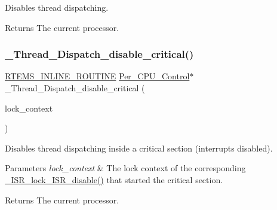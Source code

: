 Disables thread dispatching. 

\begin{DoxyReturn}{Returns}
The current processor. 
\end{DoxyReturn}
\mbox{\label{group__RTEMSScoreThread_ga5ffeb81480c63293a317f69efc74dec3}} 
\subsubsection{\texorpdfstring{\_Thread\_Dispatch\_disable\_critical()}{\_Thread\_Dispatch\_disable\_critical()}}
{\footnotesize\ttfamily \mbox{\hyperlink{group__RTEMSScoreBaseDefs_gac216239df231d5dbd15e3520b0b9313f}{R\+T\+E\+M\+S\+\_\+\+I\+N\+L\+I\+N\+E\+\_\+\+R\+O\+U\+T\+I\+NE}} \mbox{\hyperlink{structPer__CPU__Control}{Per\+\_\+\+C\+P\+U\+\_\+\+Control}}$\ast$ \+\_\+\+Thread\+\_\+\+Dispatch\+\_\+disable\+\_\+critical (\begin{DoxyParamCaption}\item[{const \mbox{\hyperlink{structISR__lock__Context}{I\+S\+R\+\_\+lock\+\_\+\+Context}} $\ast$}]{lock\+\_\+context }\end{DoxyParamCaption})}



Disables thread dispatching inside a critical section (interrupts disabled). 


\begin{DoxyParams}{Parameters}
{\em lock\+\_\+context} & The lock context of the corresponding \mbox{\hyperlink{group__RTEMSScoreISRLocks_ga36d91ceed1df931ce6291d7bc9e60573}{\+\_\+\+I\+S\+R\+\_\+lock\+\_\+\+I\+S\+R\+\_\+disable()}} that started the critical section.\\
\hline
\end{DoxyParams}
\begin{DoxyReturn}{Returns}
The current processor. 
\end{DoxyReturn}
\mbox{\label{group__RTEMSScoreThread_ga80a71da4ea096f7ea92781a872b955ae}} 
